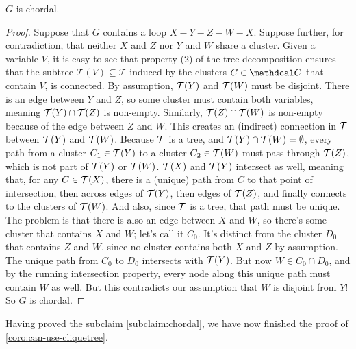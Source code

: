 \begin{subappendices}
\begin{lproof}
    \begin{iclaim}
        $G$ is chordal.
            \label{subclaim:chordal}
    \end{iclaim}
    \begin{proof}
        Suppose that $G$ contains a loop $X{-}Y{-}Z{-}W{-}X$.
        Suppose further, for contradiction, that neither $X$ and $Z$ nor $Y$ and $W$ share a cluster.
        Given a variable $V$, it is easy to see that property (2) of the tree decomposition ensures that the subtree $\mathcal T(V) \subseteq \mathcal T$ induced by the clusters $C \in \C$ that contain $V$, is connected.
        By assumption, ${\cal T}(Y)$ and ${\cal T}(W)$ must be disjoint.
        There is an edge between $Y$ and $Z$, so some cluster must contain both variables, meaning ${\cal T}(Y) \cap {\cal T}(Z)$ is non-empty.
        Similarly, ${\cal T}(Z) \cap {\cal T}(W)$ is non-empty because of the edge between $Z$ and $W$.
        This creates an (indirect) connection in $\cal T$ between ${\cal T}(Y)$ and ${\cal T}(W)$. Because $\cal T$ is a tree, and ${\cal T}(Y) \cap {\cal T}(W) = \emptyset$,
        every path from a cluster $C_1 \in {\cal T}(Y)$ to a cluster $C_2 \in {\cal T}(W)$ must pass through ${\cal T}(Z)$, which is not part of ${\cal T}(Y)$ or ${\cal T}(W)$.
        ${\cal T}(X)$ and ${\cal T}(Y)$ intersect as well, meaning that, for any $C \in {\cal T}(X)$, there is a (unique) path from $C$ to that point of intersection, then across edges of ${\cal T}(Y)$, then edges of ${\cal T}(Z)$, and finally connects to the clusters of ${\cal T}(W)$. And also, since $\cal T$ is a tree, that path must be unique.
        The problem is that there is also an edge between $X$ and $W$, so there's some cluster that contains $X$ and $W$; let's call it $C_0$.
        It's distinct from the cluster $D_0$ that contains $Z$ and $W$, since no cluster contains both $X$ and $Z$ by assumption.
        The unique path from $C_0$ to $D_0$
        intersects with ${\cal T}(Y)$.
        But now $W \in C_0 \cap D_0$, and by the running intersection property, every node along this unique path must contain $W$ as well.
        But this contradicts our assumption that $W$ is disjoint from $Y$! So $G$ is chordal.
    \end{proof}
    Having proved the subclaim \cref{subclaim:chordal}, 
    we have now finished the proof of \cref{coro:can-use-cliquetree}.
\end{lproof}



\end{subappendices}
